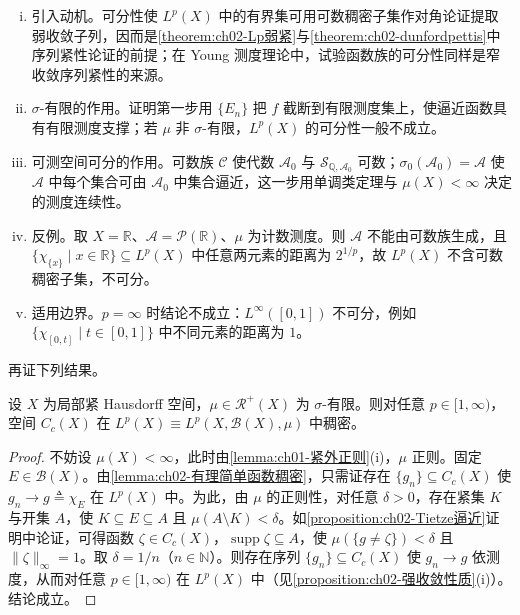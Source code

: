 \documentclass[../../main.tex]{subfiles}%
\begin{document}
\begin{remark}\label{remark:ch02-Lp可分}
\begin{enumerate}[(i)]
\item 引入动机。可分性使 $L^p(X)$ 中的有界集可用可数稠密子集作对角论证提取弱收敛子列，因而是\cref{theorem:ch02-Lp弱紧}与\cref{theorem:ch02-dunfordpettis}中序列紧性论证的前提；在 Young 测度理论中，试验函数族的可分性同样是窄收敛序列紧性的来源。
\item $\sigma$-有限的作用。证明第一步用 $\{E_n\}$ 把 $f$ 截断到有限测度集上，使逼近函数具有有限测度支撑；若 $\mu$ 非 $\sigma$-有限，$L^p(X)$ 的可分性一般不成立。
\item 可测空间可分的作用。可数族 $\mathscr C$ 使代数 $\mathscr A_0$ 与 $\mathscr S_{\mathbb Q,\mathscr A_0}$ 可数；$\sigma_0(\mathscr A_0)=\mathscr A$ 使 $\mathscr A$ 中每个集合可由 $\mathscr A_0$ 中集合逼近，这一步用单调类定理与 $\mu(X)<\infty$ 决定的测度连续性。
\item 反例。取 $X=\mathbb R$、$\mathscr A=\mathscr P(\mathbb R)$、$\mu$ 为计数测度。则 $\mathscr A$ 不能由可数族生成，且 $\{\chi_{\{x\}}\mid x\in\mathbb R\}\subseteq L^p(X)$ 中任意两元素的距离为 $2^{1/p}$，故 $L^p(X)$ 不含可数稠密子集，不可分。
\item 适用边界。$p=\infty$ 时结论不成立：$L^\infty([0,1])$ 不可分，例如 $\{\chi_{[0,t]}\mid t\in[0,1]\}$ 中不同元素的距离为 $1$。
\end{enumerate}
\end{remark}

再证下列结果。

\begin{lemma}\label{lemma:ch02-Cc稠密}
\label{lemma:ch02-稠密逼近}
设 $X$ 为局部紧 Hausdorff 空间，$\mu\in\mathscr R^+(X)$ 为 $\sigma$-有限。则对任意 $p\in[1,\infty)$，空间 $C_c(X)$ 在 $L^p(X)\equiv L^p(X,\mathscr B(X),\mu)$ 中稠密。
\end{lemma}

\begin{proof}
不妨设 $\mu(X)<\infty$，此时由\cref{lemma:ch01-紧外正则}(i)，$\mu$ 正则。固定 $E\in\mathscr B(X)$。由\cref{lemma:ch02-有理简单函数稠密}，只需证存在 $\{g_n\}\subseteq C_c(X)$ 使 $g_n\to g\triangleq\chi_E$ 在 $L^p(X)$ 中。为此，由 $\mu$ 的正则性，对任意 $\delta>0$，存在紧集 $K$ 与开集 $A$，使 $K\subseteq E\subseteq A$ 且 $\mu(A\setminus K)<\delta$。如\cref{proposition:ch02-Tietze逼近}证明中论证，可得函数 $\zeta\in C_c(X)$，$\operatorname{supp}\zeta\subseteq A$，使 $\mu(\{g\neq\zeta\})<\delta$ 且 $\|\zeta\|_\infty=1$。取 $\delta=1/n$（$n\in\mathbb N$）。则存在序列 $\{g_n\}\subseteq C_c(X)$ 使 $g_n\to g$ 依测度，从而对任意 $p\in[1,\infty)$ 在 $L^p(X)$ 中（见\cref{proposition:ch02-强收敛性质}(i)）。结论成立。
\end{proof}
\end{document}
